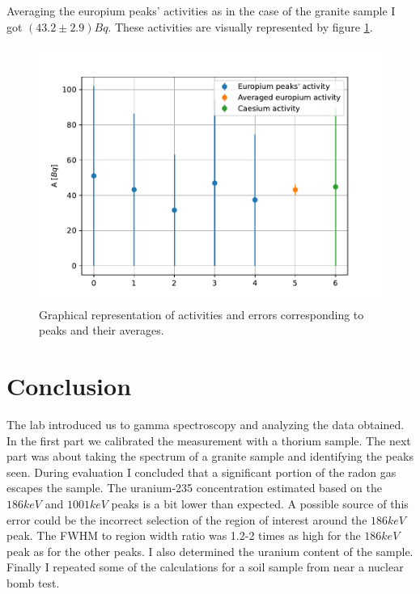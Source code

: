 \documentclass[pdftex,12pt,a4paper]{article}
\begin{document}
		Averaging the europium peaks' activities as in the case of the granite sample I got $(43.2\pm 2.9)Bq$. These activities are visually represented by figure \ref{soilaveragesfig}.
			\begin{figure}[H]
			\centering
			\includegraphics[scale=1]{./figs/soilactivities.pdf}
			\caption{Graphical representation of activities and errors corresponding to peaks and their averages.}
			\label{soilaveragesfig}
		\end{figure}
	\section{Conclusion}
		The lab introduced us to gamma spectroscopy and analyzing the data obtained. In the first part we calibrated the measurement with a thorium sample. The next part was about taking the spectrum of a granite sample and identifying the peaks seen. During evaluation I concluded that a significant portion of the radon gas escapes the sample. The uranium-235 concentration estimated based on the $186keV$ and $1001keV$ peaks is a bit lower than expected. A possible source of this error could be the incorrect selection of the region of interest around the $186keV$ peak. The FWHM to region width ratio was 1.2-2 times as high for the $186keV$ peak as for the other peaks. I also determined the uranium content of the sample. Finally I repeated some of the calculations for a soil sample from near a nuclear bomb test.
	
\end{document}
